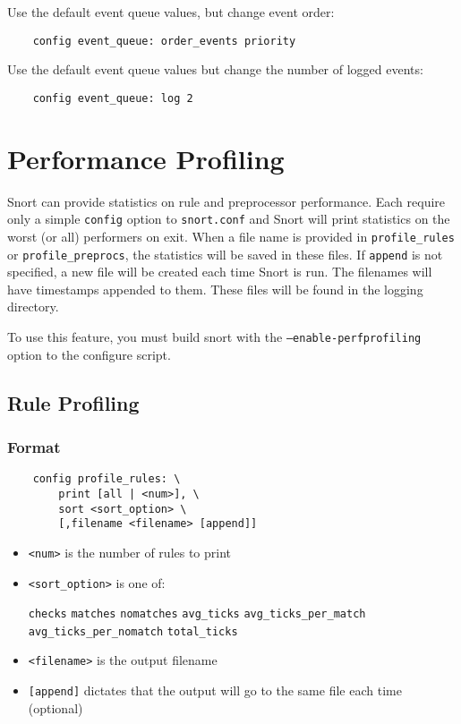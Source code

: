 \documentclass[english]{report}
\begin{document}
Use the default event queue values, but change event order:

\begin{verbatim}
    config event_queue: order_events priority
\end{verbatim}

Use the default event queue values but change the number of logged events:

\begin{verbatim}
    config event_queue: log 2
\end{verbatim}

\section{Performance Profiling}

Snort can provide statistics on rule and preprocessor performance.  Each
require only a simple \texttt{config} option to \texttt{snort.conf} and Snort
will print statistics on the worst (or all) performers on exit. When a file
name is provided in \texttt{profile\_rules} or \texttt{profile\_preprocs}, the
statistics will be saved in these files.  If \texttt{append} is not specified,
a new file will be created each time Snort is run. The filenames will have
timestamps appended to them.  These files will be found in the logging
directory.

To use this feature, you must build snort with the \texttt{--enable-perfprofiling}
option to the configure script.

\subsection{Rule Profiling}
\label{rule profiling}

\subsubsection{Format}

\begin{verbatim}
    config profile_rules: \
        print [all | <num>], \
        sort <sort_option> \
        [,filename <filename> [append]]
\end{verbatim}

\begin{itemize}
\item \texttt{<num>} is the number of rules to print
\item \texttt{<sort\_option>} is one of:

    \subitem \texttt{checks}
    \subitem \texttt{matches}
    \subitem \texttt{nomatches}
    \subitem \texttt{avg\_ticks}
    \subitem \texttt{avg\_ticks\_per\_match}
    \subitem \texttt{avg\_ticks\_per\_nomatch}
    \subitem \texttt{total\_ticks}

\item \texttt{<filename>} is the output filename

\item \texttt{[append]} dictates that the output will go to the same file each
time (optional)

\end{itemize}
\end{document}
